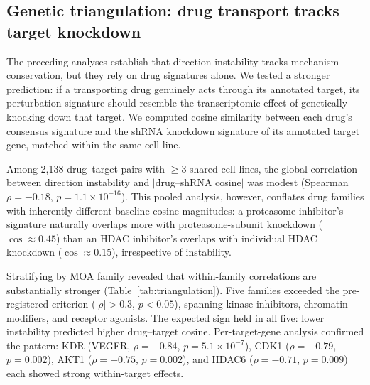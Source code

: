 \documentclass{article}
\begin{document}
\subsection{Genetic triangulation: drug transport tracks target knockdown}
\label{sec:genetic}

The preceding analyses establish that direction instability tracks
mechanism conservation, but they rely on drug signatures alone. We tested
a stronger prediction: if a transporting drug genuinely acts through its
annotated target, its perturbation signature should resemble the
transcriptomic effect of genetically knocking down that target. We computed
cosine similarity between each drug's consensus signature and the shRNA
knockdown signature of its annotated target gene, matched within the same
cell line.

Among 2{,}138 drug--target pairs with $\geq3$ shared cell lines, the global
correlation between direction instability and $|$drug--shRNA cosine$|$ was
modest (Spearman $\rho = -0.18$, $p = 1.1 \times 10^{-16}$). This pooled
analysis, however, conflates drug families with inherently different
baseline cosine magnitudes: a proteasome inhibitor's signature naturally
overlaps more with proteasome-subunit knockdown ($\cos \approx 0.45$) than
an HDAC inhibitor's overlaps with individual HDAC knockdown
($\cos \approx 0.15$), irrespective of instability.

Stratifying by MOA family revealed that within-family correlations are
substantially stronger (Table~\ref{tab:triangulation}). Five families
exceeded the pre-registered criterion ($|\rho| > 0.3$, $p < 0.05$),
spanning kinase inhibitors, chromatin modifiers, and receptor agonists.
The expected sign held in all five: lower instability predicted higher
drug--target cosine. Per-target-gene analysis confirmed the pattern:
KDR (VEGFR, $\rho = -0.84$, $p = 5.1 \times 10^{-7}$), CDK1
($\rho = -0.79$, $p = 0.002$), AKT1 ($\rho = -0.75$, $p = 0.002$),
and HDAC6 ($\rho = -0.71$, $p = 0.009$) each showed strong
within-target effects.
\end{document}

